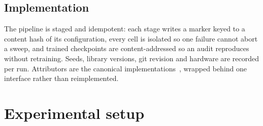 \subsection{Implementation}

The pipeline is staged and idempotent: each stage writes a marker keyed to a
content hash of its configuration, every cell is isolated so one failure cannot
abort a sweep, and trained checkpoints are content-addressed so an audit
reproduces without retraining. Seeds, library versions, git revision and
hardware are recorded per run. Attributors are the canonical
implementations~\cite{captum,pyg}, wrapped behind one interface rather than
reimplemented.

\section{Experimental setup}
\label{sec:setup}

